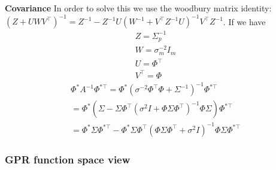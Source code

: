 \documentclass[11pt]{article}
\begin{document}
\textbf{Covariance}
In order to solve this we use the woodbury matrix identity: $(Z + UWV^\top)^{-1} = Z^{-1} - Z^{-1} U (W^{-1} + V^\top Z^{-1} U)^{-1} V^\top Z^{-1}$.
If we have 
\begin{gather}
  Z = \Sigma_p^{-1} \\
  W = \sigma_m^{-2} I_m \\
  U = \Phi^\top \\
  V^\top = \Phi
\end{gather}
\begin{gather}
  \Phi^* A^{-1} \Phi^{* \top} = \Phi^* (\sigma^{-2} \Phi^\top \Phi + \Sigma^{-1})^{-1} \Phi^{* \top} \\
  = \Phi^* (\Sigma - \Sigma \Phi^\top(\sigma^{2} I + \Phi \Sigma \Phi^\top )^{-1} \Phi \Sigma) \Phi^{* \top} \\
  = \Phi^* \Sigma \Phi^{* \top} - \Phi^* \Sigma \Phi^\top (\Phi \Sigma \Phi^\top + \sigma^2 I)^{-1} \Phi \Sigma \Phi^{* \top}
\end{gather}
\subsubsection{GPR function space view}
\end{document}
